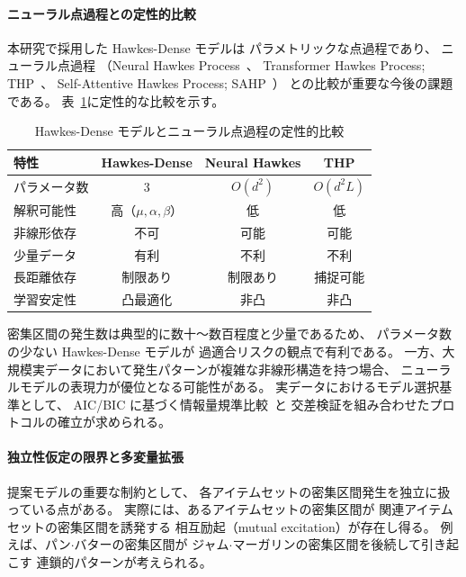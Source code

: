 \paragraph{ニューラル点過程との定性的比較}
本研究で採用した Hawkes-Dense モデルは
パラメトリックな点過程であり、
ニューラル点過程
（Neural Hawkes Process~\cite{mei2017neural}、
Transformer Hawkes Process; THP~\cite{zuo2020transformer}、
Self-Attentive Hawkes Process; SAHP~\cite{zhang2020self}）
との比較が重要な今後の課題である。
表~\ref{tab:neural_comparison}に定性的な比較を示す。

\begin{table}[t]
  \centering
  \caption{Hawkes-Dense モデルとニューラル点過程の定性的比較}
  \label{tab:neural_comparison}
  \begin{tabular}{lccc}
    \toprule
    特性 & Hawkes-Dense & Neural Hawkes & THP \\
    \midrule
    パラメータ数 & 3 & $O(d^2)$ & $O(d^2 L)$ \\
    解釈可能性 & 高（$\mu, \alpha, \beta$） & 低 & 低 \\
    非線形依存 & 不可 & 可能 & 可能 \\
    少量データ & 有利 & 不利 & 不利 \\
    長距離依存 & 制限あり & 制限あり & 捕捉可能 \\
    学習安定性 & 凸最適化 & 非凸 & 非凸 \\
    \bottomrule
  \end{tabular}
\end{table}

密集区間の発生数は典型的に数十〜数百程度と少量であるため、
パラメータ数の少ない Hawkes-Dense モデルが
過適合リスクの観点で有利である。
一方、大規模実データにおいて発生パターンが複雑な非線形構造を持つ場合、
ニューラルモデルの表現力が優位となる可能性がある。
実データにおけるモデル選択基準として、
AIC/BIC に基づく情報量規準比較~\cite{akaike1974new,schwarz1978estimating}と
交差検証を組み合わせたプロトコルの確立が求められる。

\paragraph{独立性仮定の限界と多変量拡張}
提案モデルの重要な制約として、
各アイテムセットの密集区間発生を独立に扱っている点がある。
実際には、あるアイテムセットの密集区間が
関連アイテムセットの密集区間を誘発する
相互励起（mutual excitation）が存在し得る。
例えば、パン$\cdot$バターの密集区間が
ジャム$\cdot$マーガリンの密集区間を後続して引き起こす
連鎖的パターンが考えられる。

